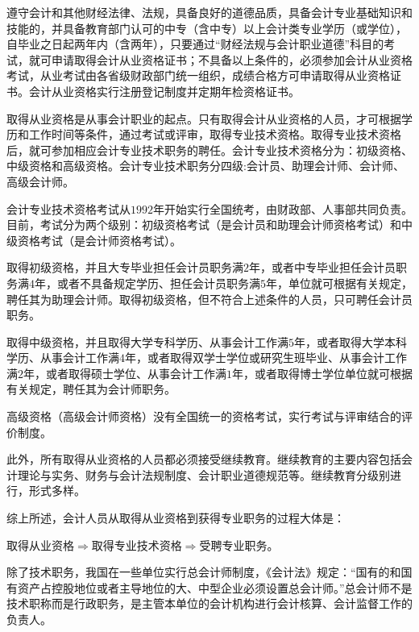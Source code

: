 \begin{enumerate}
\begin{enumerate}
								遵守会计和其他财经法律、法规，具备良好的道德品质，具备会计专业基础知识和技能的，并具备教育部门认可的中专（含中专）以上会计类专业学历（或学位），自毕业之日起两年内（含两年），只要通过“财经法规与会计职业道德”科目的考试，就可申请取得会计从业资格证书；不具备以上条件的，必须参加会计从业资格考试，从业考试由各省级财政部门统一组织，成绩合格方可申请取得从业资格证书。会计从业资格实行注册登记制度并定期年检资格证书。
								
								取得从业资格是从事会计职业的起点。只有取得会计从业资格的人员，才可根据学历和工作时间等条件，通过考试或评审，取得专业技术资格。取得专业技术资格后，就可参加相应会计专业技术职务的聘任。会计专业技术资格分为：初级资格、中级资格和高级资格。会计专业技术职务分四级:会计员、助理会计师、会计师、高级会计师。
								
								会计专业技术资格考试从$1992$年开始实行全国统考，由财政部、人事部共同负责。目前，考试分为两个级别：初级资格考试（是会计员和助理会计师资格考试）和中级资格考试（是会计师资格考试）。
								
								取得初级资格，并且大专毕业担任会计员职务满$2$年，或者中专毕业担任会计员职务满$4$年，或者不具备规定学历、担任会计员职务满$5$年，单位就可根据有关规定，聘任其为助理会计师。取得初级资格，但不符合上述条件的人员，只可聘任会计员职务。
								
								取得中级资格，并且取得大学专科学历、从事会计工作满$5$年，或者取得大学本科学历、从事会计工作满$4$年，或者取得双学士学位或研究生班毕业、从事会计工作满$2$年，或者取得硕士学位、从事会计工作满$1$年，或者取得博士学位单位就可根据有关规定，聘任其为会计师职务。
								
								高级资格（高级会计师资格）没有全国统一的资格考试，实行考试与评审结合的评价制度。

								此外，所有取得从业资格的人员都必须接受继续教育。继续教育的主要内容包括会计理论与实务、财务与会计法规制度、会计职业道德规范等。继续教育分级别进行，形式多样。
								
								综上所述，会计人员从取得从业资格到获得专业职务的过程大体是：
								
								取得从业资格$\Rightarrow$取得专业技术资格$\Rightarrow$受聘专业职务。
								
								除了技术职务，我国在一些单位实行总会计师制度，《会计法》规定：“国有的和国有资产占控股地位或者主导地位的大、中型企业必须设置总会计师。”总会计师不是技术职称而是行政职务，是主管本单位的会计机构进行会计核算、会计监督工作的负责人。
						\end{enumerate}

				\end{enumerate}


